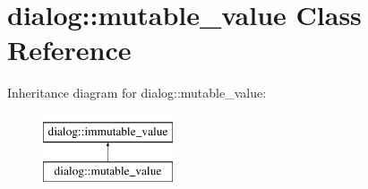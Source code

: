 \hypertarget{classdialog_1_1mutable__value}{}\section{dialog\+:\+:mutable\+\_\+value Class Reference}
\label{classdialog_1_1mutable__value}
Inheritance diagram for dialog\+:\+:mutable\+\_\+value\+:\begin{figure}[H]
\begin{center}
\leavevmode
\includegraphics[height=2.000000cm]{classdialog_1_1mutable__value}
\end{center}
\end{figure}
